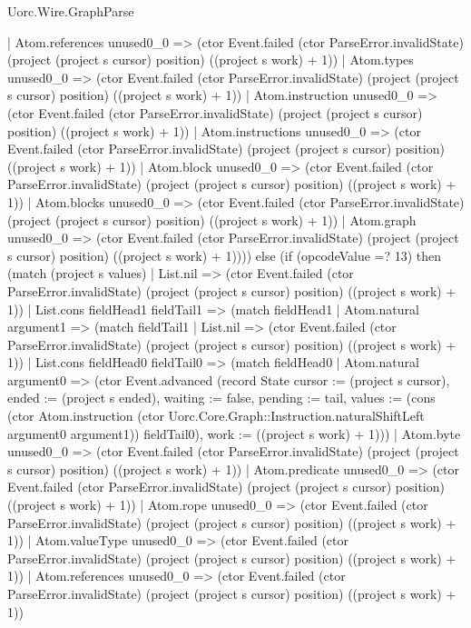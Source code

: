 \begin{lexlean}{Uorc.Wire.GraphParse}
\begin{semanticmodule}
{          | Atom.references unused0_0 => (ctor Event.failed (ctor ParseError.invalidState) (project (project s cursor) position) ((project s work) + 1))
          | Atom.types unused0_0 => (ctor Event.failed (ctor ParseError.invalidState) (project (project s cursor) position) ((project s work) + 1))
          | Atom.instruction unused0_0 => (ctor Event.failed (ctor ParseError.invalidState) (project (project s cursor) position) ((project s work) + 1))
          | Atom.instructions unused0_0 => (ctor Event.failed (ctor ParseError.invalidState) (project (project s cursor) position) ((project s work) + 1))
          | Atom.block unused0_0 => (ctor Event.failed (ctor ParseError.invalidState) (project (project s cursor) position) ((project s work) + 1))
          | Atom.blocks unused0_0 => (ctor Event.failed (ctor ParseError.invalidState) (project (project s cursor) position) ((project s work) + 1))
          | Atom.graph unused0_0 => (ctor Event.failed (ctor ParseError.invalidState) (project (project s cursor) position) ((project s work) + 1)))) else (if (opcodeValue =? 13) then (match (project s values)
        | List.nil => (ctor Event.failed (ctor ParseError.invalidState) (project (project s cursor) position) ((project s work) + 1))
        | List.cons fieldHead1 fieldTail1 => (match fieldHead1
          | Atom.natural argument1 => (match fieldTail1
            | List.nil => (ctor Event.failed (ctor ParseError.invalidState) (project (project s cursor) position) ((project s work) + 1))
            | List.cons fieldHead0 fieldTail0 => (match fieldHead0
              | Atom.natural argument0 => (ctor Event.advanced (record State {cursor := (project s cursor), ended := (project s ended), waiting := false, pending := tail, values := (cons (ctor Atom.instruction (ctor Uorc.Core.Graph::Instruction.naturalShiftLeft argument0 argument1)) fieldTail0), work := ((project s work) + 1)}))
              | Atom.byte unused0_0 => (ctor Event.failed (ctor ParseError.invalidState) (project (project s cursor) position) ((project s work) + 1))
              | Atom.predicate unused0_0 => (ctor Event.failed (ctor ParseError.invalidState) (project (project s cursor) position) ((project s work) + 1))
              | Atom.rope unused0_0 => (ctor Event.failed (ctor ParseError.invalidState) (project (project s cursor) position) ((project s work) + 1))
              | Atom.valueType unused0_0 => (ctor Event.failed (ctor ParseError.invalidState) (project (project s cursor) position) ((project s work) + 1))
              | Atom.references unused0_0 => (ctor Event.failed (ctor ParseError.invalidState) (project (project s cursor) position) ((project s work) + 1))
}
\end{semanticmodule}
\end{lexlean}
